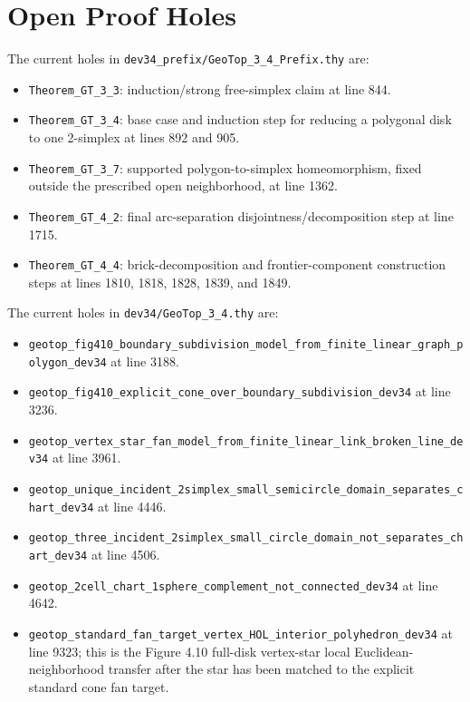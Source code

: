 \documentclass{article}
\begin{document}
\section*{Open Proof Holes}

The current holes in \texttt{dev34\_prefix/GeoTop\_3\_4\_Prefix.thy} are:
\begin{itemize}
\item \texttt{Theorem\_GT\_3\_3}: induction/strong free-simplex claim at line 844.
\item \texttt{Theorem\_GT\_3\_4}: base case and induction step for reducing a polygonal disk to one 2-simplex at lines 892 and 905.
\item \texttt{Theorem\_GT\_3\_7}: supported polygon-to-simplex homeomorphism, fixed outside the prescribed open neighborhood, at line 1362.
\item \texttt{Theorem\_GT\_4\_2}: final arc-separation disjointness/decomposition step at line 1715.
\item \texttt{Theorem\_GT\_4\_4}: brick-decomposition and frontier-component construction steps at lines 1810, 1818, 1828, 1839, and 1849.
\end{itemize}

The current holes in \texttt{dev34/GeoTop\_3\_4.thy} are:
\begin{itemize}
\item \texttt{geotop\_fig410\_boundary\_subdivision\_model\_from\_finite\_linear\_graph\_polygon\_dev34} at line 3188.
\item \texttt{geotop\_fig410\_explicit\_cone\_over\_boundary\_subdivision\_dev34} at line 3236.
\item \texttt{geotop\_vertex\_star\_fan\_model\_from\_finite\_linear\_link\_broken\_line\_dev34} at line 3961.
\item \texttt{geotop\_unique\_incident\_2simplex\_small\_semicircle\_domain\_separates\_chart\_dev34} at line 4446.
\item \texttt{geotop\_three\_incident\_2simplex\_small\_circle\_domain\_not\_separates\_chart\_dev34} at line 4506.
\item \texttt{geotop\_2cell\_chart\_1sphere\_complement\_not\_connected\_dev34} at line 4642.
\item \texttt{geotop\_standard\_fan\_target\_vertex\_HOL\_interior\_polyhedron\_dev34} at line 9323; this is the Figure 4.10 full-disk vertex-star local Euclidean-neighborhood transfer after the star has been matched to the explicit standard cone fan target.
\end{itemize}
\end{document}

